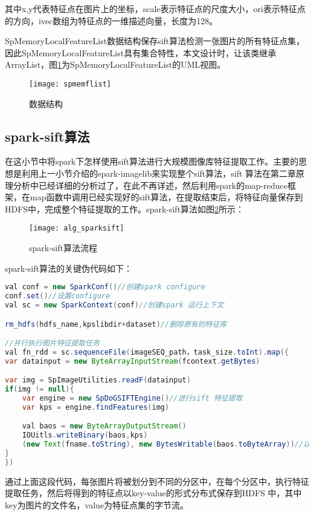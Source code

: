 其中x,y代表特征点在图片上的坐标，scale表示特征点的尺度大小，ori表示特征点的方向，ivec数组为特征点的一维描述向量，长度为128。

SpMemoryLocalFeatureList数据结构保存sift算法检测一张图片的所有特征点集，因此SpMemoryLocalFeatureList具有集合特性，本文设计时，让该类继承ArrayList，图\ref{fig:spmemflist}为SpMemoryLocalFeatureList的UML视图。
\begin{figure}[htp]
\centering
\texttt{[image: spmemflist]}
\caption{数据结构}
\label{fig:spmemflist}
\end{figure}

\subsection{spark-sift算法}
在这小节中将spark下怎样使用sift算法进行大规模图像库特征提取工作。主要的思想是利用上一小节介绍的spark-imagelib来实现整个sift算法，sift 算法在第二章原理分析中已经详细的分析过了，在此不再详述，然后利用spark的map-reduce框架，在map函数中调用已经实现好的sift算法，在提取结束后，将特征向量保存到HDFS中，完成整个特征提取的工作。spark-sift算法如图\ref{fig:alg_sparksift}所示：
\begin{figure}[htp]
\centering
\texttt{[image: alg\_sparksift]}
\caption{spark-sift算法流程}
\label{fig:alg_sparksift}
\end{figure}

spark-sift算法的关键伪代码如下：
\begin{lstlisting}[language=Java]
val conf = new SparkConf()//创建spark configure
conf.set()//设置configure
val sc = new SparkContext(conf)//创建spark 运行上下文

rm_hdfs(hdfs_name,kpslibdir+dataset)//删除原有的特征库

//并行执行图片特征提取任务
val fn_rdd = sc.sequenceFile(imageSEQ_path，task_size.toInt).map({
var datainput = new ByteArrayInputStream(fcontext.getBytes)

var img = SpImageUtilities.readF(datainput)
if(img != null){
    var engine = new SpDoGSIFTEngine()//进行sift 特征提取
    var kps = engine.findFeatures(img)

    val baos = new ByteArrayOutputStream()
    IOUitls.writeBinary(baos,kps)
    (new Text(fname.toString), new BytesWritable(baos.toByteArray))//以key-value形式返回提取的特征点，key为图片名，value为特征点集
}
})
\end{lstlisting}

通过上面这段代码，每张图片将被划分到不同的分区中，在每个分区中，执行特征提取任务，然后将得到的特征点以key-value的形式分布式保存到HDFS 中，其中key为图片的文件名，value为特征点集的字节流。
